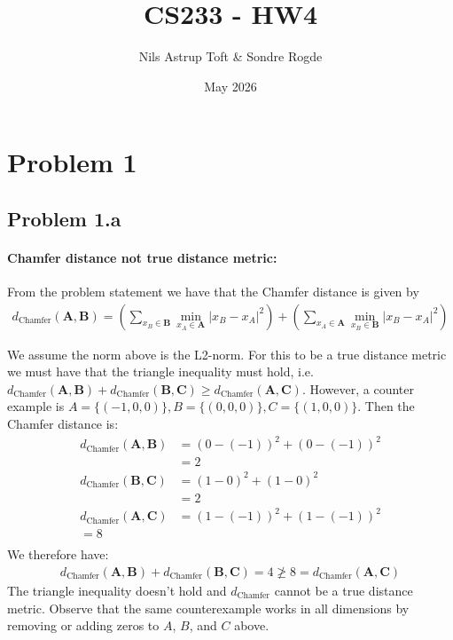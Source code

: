 \documentclass{article}
\title{CS233 - HW4}
\author{Nils Astrup Toft \& Sondre Rogde}
\date{May 2026}
\begin{document}
\maketitle

\section*{Problem 1}
\subsection*{Problem 1.a}
\paragraph{Chamfer distance not true distance metric:}
From the problem statement we have that the Chamfer distance is given by
\begin{align*}
    d_{\text{Chamfer}}(\textbf{A}, \textbf{B}) =(\sum_{x_B \in \textbf{B}} \min_{x_A\in \textbf{A}} |x_B - x_A|^2) + (\sum_{x_A \in \textbf{A}} \min_{x_B\in \textbf{B}} |x_B - x_A|^2)
\end{align*}

We assume the norm above is the L2-norm. For this to be a true distance metric we must have that the triangle inequality must hold, i.e. $d_\text{Chamfer}(\textbf{A}, \textbf{B}) + d_\text{Chamfer}(\textbf{B}, \textbf{C}) \geq d_\text{Chamfer}(\textbf{A}, \textbf{C})$. However, a counter example is $A = \{(-1,0,0)\}, B = \{(0,0,0)\}, C = \{(1,0,0)\}$. Then the Chamfer distance is:
\begin{align*}
    d_\text{Chamfer}(\textbf{A}, \textbf{B}) &= (0-(-1))^2 + (0 - (-1))^2\\
    &= 2\\
    d_\text{Chamfer}(\textbf{B}, \textbf{C}) &= (1-0)^2 + (1-0)^2\\
    &=2\\
    d_\text{Chamfer}(\textbf{A}, \textbf{C}) &= (1-(-1))^2 + (1 - (-1))^2\\
    = 8\\
\end{align*}
We therefore have:
\begin{align*}
    d_\text{Chamfer}(\textbf{A}, \textbf{B}) + d_\text{Chamfer}(\textbf{B}, \textbf{C}) = 4 \ngeq 8 = d_\text{Chamfer}(\textbf{A}, \textbf{C})
\end{align*}
The triangle inequality doesn't hold and $d_\text{Chamfer}$ cannot be a true distance metric. Observe that the same counterexample works in all dimensions by removing or adding zeros to $A$, $B$, and $C$ above. 
\end{document}
